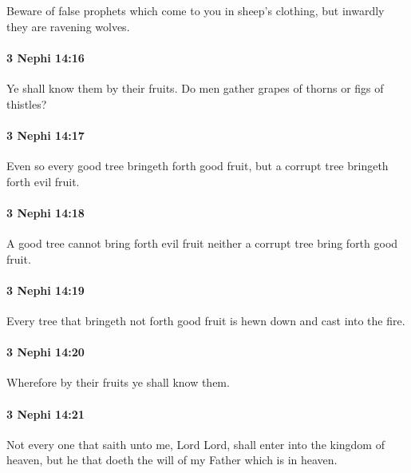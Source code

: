 			Beware of false prophets which come to you in sheep's clothing,
			but inwardly they are ravening wolves.

		\paragraph{3 Nephi 14:16} %
			\label{3NEPHI-14-16}

			Ye shall know them by their fruits.
			Do men gather grapes of thorns or figs of thistles?

		\paragraph{3 Nephi 14:17} %
			\label{3NEPHI-14-17}

			Even so every good tree bringeth forth good fruit,
			but a corrupt tree bringeth forth evil fruit.

		\paragraph{3 Nephi 14:18} %
			\label{3NEPHI-14-18}

			A good tree cannot bring forth evil fruit
			neither a corrupt tree bring forth good fruit.

		\paragraph{3 Nephi 14:19} %
			\label{3NEPHI-14-19}

			Every tree that bringeth not forth good fruit
			is hewn down and cast into the fire.

		\paragraph{3 Nephi 14:20} %
			\label{3NEPHI-14-20}

			Wherefore by their fruits ye shall know them.

		\paragraph{3 Nephi 14:21} %
			\label{3NEPHI-14-21}

			Not every one that saith unto me, Lord Lord,
			shall enter into the kingdom of heaven,
			but he that doeth the will of my Father which is in heaven.

